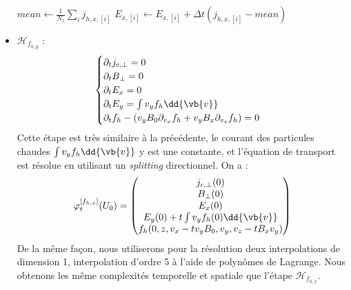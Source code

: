 \begin{itemize}
\begin{algorithm}
\begin{algorithmic}[1]
          \State $mean \gets \frac{1}{N_z}\sum_i j_{h,x,[i]}$
            \State $E_{x,[i]} \gets E_{x,[i]} + \Delta t(j_{h,x,[i]}-mean)$
          \EndFor
        \EndFunction

          \vspace{0.25cm}

          \State {}
          \State {}
        \EndFunction
      \end{algorithmic}
    \end{algorithm}

  \item $\mathcal{H}_{f_{h,y}}$ :
    $$
      \begin{cases}
        \partial_t j_{c,\perp} = 0 \\
        \partial_t B_{\perp} = 0 \\
        \partial_t E_{x} = 0 \\
        \partial_t E_{y} = \int v_yf_h\dd{\vb{v}} \\
        \partial_t f_h - (v_yB_0\partial_{v_x}f_h + v_yB_x\partial_{v_z}f_h) = 0
      \end{cases}
    $$
    Cette étape est très similaire à la précédente, le courant des particules chaudes $\int v_yf_h\dd{\vb{v}}$ y est une constante, et l'équation de transport est résolue en utilisant un \emph{splitting} directionnel. On a :
    $$
      \varphi_t^{[f_{h,x}]}(U_0) = \begin{pmatrix}
        j_{c,\perp}(0) \\
        B_{\perp}(0) \\
        E_x(0) \\
        E_y(0) + t\int v_yf_h(0)\dd{\vb{v}} \\
        f_h(0,z,v_x-tv_yB_0,v_y,v_z-tB_xv_y)
      \end{pmatrix}
    $$
    De la même façon, nous utiliserons pour la résolution deux interpolations de dimension 1, interpolation d'ordre 5 à l'aide de polynômes de Lagrange. Nous obtenons les même complexités temporelle et spatiale que l'étape $\mathcal{H}_{f_{h,x}}$.


\end{itemize}
